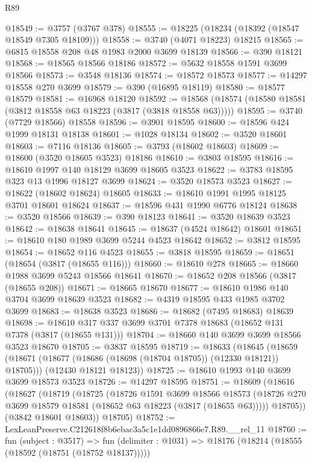 \begin{lexlean}{R89}
\begin{coremodule}
@18549 := @3757 (@3767 @378)
@18555 := @18225 (@18234 (@18392 (@18547 @18549 @7305 @18109)))
@18558 := @3740 (@4071 @18223) @18215
@18565 := @6815 @18558 @208 @48 @1983 @2000 @3699 @18139
@18566 := @390 @18121
@18568 := @18565 @18566 @18186
@18572 := @5632 @18558 @1591 @3699 @18566
@18573 := @3548 @18136
@18574 := @18572 @18573
@18577 := @14297 @18558 @270 @3699
@18579 := @390 (@16895 @18119)
@18580 := @18577 @18579
@18581 := @16968 @18120
@18592 := @18568 (@18574 (@18580 @18581 (@3812 @18558 @63 @18223 (@3817 (@3818 @18558 @63)))))
@18595 := @3740 (@7729 @18566) @18558
@18596 := @3901 @18595
@18600 := @18596 @424 @1999 @18131 @18138
@18601 := @1028 @18134
@18602 := @3520 @18601
@18603 := @7116 @18136
@18605 := @3793 (@18602 @18603)
@18609 := @18600 (@3520 @18605 @3523) @18186
@18610 := @3803 @18595
@18616 := @18610 @1997 @140 @18129 @3699 @18605 @3523
@18622 := @3783 @18595 @323 @13 @1996 @18127 @3699
@18624 := @3520 @18573 @3523
@18627 := @18622 (@18602 @18624) @18605
@18633 := @18610 @1991 @1995 @18125 @3701 @18601 @18624
@18637 := @18596 @431 @1990 @6776 @18124
@18638 := @3520 @18566
@18639 := @390 @18123
@18641 := @3520 @18639 @3523
@18642 := @18638 @18641
@18645 := @18637 (@4524 @18642) @18601
@18651 := @18610 @180 @1989 @3699 @5244 @4523 @18642
@18652 := @3812 @18595
@18654 := @18652 @116 @4523
@18655 := @3818 @18595
@18659 := @18651 (@18654 (@3817 (@18655 @116)))
@18660 := @18610 @278
@18665 := @18660 @1988 @3699 @5243 @18566 @18641
@18670 := @18652 @208 @18566 (@3817 (@18655 @208))
@18671 := @18665 @18670
@18677 := @18610 @1986 @140 @3704 @3699 @18639 @3523
@18682 := @4319 @18595 @433 @1985 @3702 @3699
@18683 := @18638 @3523
@18686 := @18682 (@7495 @18683) @18639
@18698 := @18610 @317 @337 @3699 @3701 @7378 @18683 (@18652 @131 @7378 (@3817 (@18655 @131)))
@18704 := @18660 @140 @3699 @3699 @18566 @3523 @18670
@18705 := @3837 @18595
@18719 := @18633
    (@18645
      (@18659 (@18671 (@18677 (@18686 (@18698 (@18704 @18705)) (@12330 @18121)) @18705)))
      (@12430 @18121 @18123))
@18725 := @18610 @1993 @140 @3699 @3699 @18573 @3523
@18726 := @14297 @18595
@18751 := @18609
    (@18616
      (@18627
        (@18719
          (@18725
            (@18726
              @1591
              @3699
              @18566
              @18573
              (@18726 @270 @3699 @18579 @18581 (@18652 @63 @18223 (@3817 (@18655 @63)))))
            @18705))
        (@3842 @18601 @18603))
      @18705)
@18752 := LexLeanPreserve.C212618f8b6ebac3a5c1e1dd0896866e7.R89.__rel_11
@18760 := fun (subject : @3517) =>
  fun (delimiter : @1031) => @18176 (@18214 (@18555 (@18592 (@18751 (@18752 @18137)))))

\end{coremodule}
\end{lexlean}
